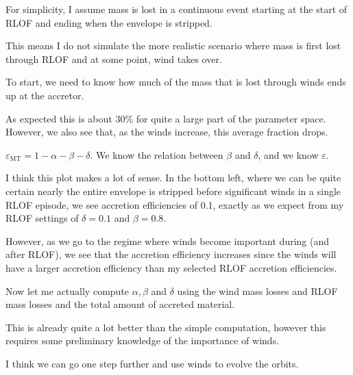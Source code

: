 \documentclass[a4paper,11pt]{article}
\begin{document}
For simplicity, I assume mass is lost in a continuous event starting at the start of RLOF and
ending when the envelope is stripped.

This means I do not simulate the more realistic scenario where mass is first lost through RLOF and at
some point, wind takes over.

\nextpage

To start, we need to know how much of the mass that is lost through winds ends up at the accretor.

\begin{figure}[ht]
	\centering
\end{figure}

As expected this is about \(30\%\) for quite a large part of the parameter space.
However, we also
see that, as the winds increase, this average fraction drops.

\(\varepsilon_\text{MT} = 1 - \alpha - \beta - \delta \).
We know the relation between \(\beta \) and \(\delta \), and we know
\(\varepsilon \).

\begin{figure}[ht]
	\centering
\end{figure}

I think this plot makes a lot of sense.
In the bottom left, where we can be quite certain nearly
the entire envelope is stripped before significant winds in a single RLOF episode, we see
accretion efficiencies of 0.1, exactly as we expect from my RLOF settings of \(\delta =0.1\) and \(\beta =0.8\).

However, as we go to the regime where winds become important during (and after RLOF), we see that the accretion efficiency increases since
the winds will have a larger accretion efficiency than my selected RLOF accretion efficiencies.

Now let me actually compute \(\alpha , \beta \) and \(\delta \) using the wind mass losses and RLOF mass losses and the
total amount of accreted material.

\begin{figure}[ht]
	\centering
\end{figure}

This is already quite a lot better than the simple computation, however this requires some preliminary knowledge of the
importance of winds.

I think we can go one step further and use \citet{saladino2018} winds to evolve the orbits.
\end{document}
